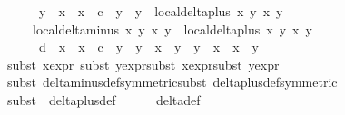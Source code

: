 \begin{isabellebody}
\ \ \ \ \ y{}\ {\isacharasterisk}\ {\isacharparenleft}x{}\ {\isacharasterisk}\ x{}\ {\isacharminus}\ c\ {\isacharasterisk}\ y{}\ {\isacharasterisk}\ y{}{\isacharparenright}\ {\isacharasterisk}\ local{\isachardot}delta{\isacharunderscore}plus\ x{}\ y{}\ x{}\ y{}{\isacharparenright}\ {\isacharasterisk}\isanewline
\ \ \ \ {\isacharparenleft}local{\isachardot}delta{\isacharunderscore}minus\ x{}\ y{}\ x{}\ y{}\ {\isacharasterisk}\ local{\isachardot}delta{\isacharunderscore}plus\ x{}\ y{}\ x{}\ y{}\ {\isacharplus}\isanewline
\ \ \ \ \ d\ {\isacharasterisk}\ {\isacharparenleft}x{}\ {\isacharasterisk}\ x{}\ {\isacharminus}\ c\ {\isacharasterisk}\ y{}\ {\isacharasterisk}\ y{}{\isacharparenright}\ {\isacharasterisk}\ {\isacharparenleft}x{}\ {\isacharasterisk}\ y{}\ {\isacharplus}\ y{}\ {\isacharasterisk}\ x{}{\isacharparenright}\ {\isacharasterisk}\ x{}\ {\isacharasterisk}\ y{}{\isacharparenright}{\isachardoublequoteclose}\isanewline
\ \ \ \ \isamarkupfalse%
{\isacharparenleft}{\isacharparenleft}subst\ x{}{\isacharprime}{\isacharunderscore}expr{\isacharparenright}{\isacharplus}{\isacharcomma}\ {\isacharparenleft}subst\ y{}{\isacharprime}{\isacharunderscore}expr{\isacharparenright}{\isacharplus}{\isacharcomma}{\isacharparenleft}subst\ x{}{\isacharprime}{\isacharunderscore}expr{\isacharparenright}{\isacharplus}{\isacharcomma}{\isacharparenleft}subst\ y{}{\isacharprime}{\isacharunderscore}expr{\isacharparenright}{\isacharplus}{\isacharparenright}\isanewline
\ \ \ \ \isamarkupfalse%
{\isacharparenleft}{\isacharparenleft}subst\ delta{\isacharunderscore}minus{\isacharunderscore}def{\isacharbrackleft}symmetric{\isacharbrackright}{\isacharparenright}{\isacharplus}{\isacharcomma}{\isacharparenleft}subst\ delta{\isacharunderscore}plus{\isacharunderscore}def{\isacharbrackleft}symmetric{\isacharbrackright}{\isacharparenright}{\isacharplus}{\isacharparenright}\isanewline
\ \ \ \ \isamarkupfalse%
{\isacharparenleft}subst\ {\isacharparenleft}{}{\isacharparenright}\ delta{\isacharunderscore}plus{\isacharunderscore}def{\isacharparenright}\isanewline
\ \ \ \ \isamarkupfalse%
\ delta{\isacharunderscore}def\isanewline
\ \ \ \ \isamarkupfalse%

\end{isabellebody}
